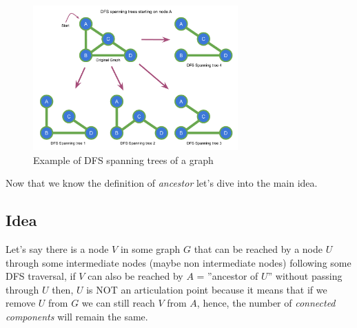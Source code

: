 \documentclass[twoside, openany]{book}
\begin{document}
\begin{figure}[H]
  \centering
  \includegraphics[width=0.7\textwidth]{"Images/Graph Theory/Articulation Points And Bridges/g2.pdf"}
  \caption{Example of DFS spanning trees of a graph}
  \label{fig:apb_g2}
\end{figure}


Now that we know the definition of \textit{ancestor} let's dive into the main idea.

\subsection*{Idea}

Let's say there is a node $V$ in some graph $G$ that can be reached by a node $U$ through some
intermediate nodes (maybe non intermediate nodes) following some DFS traversal, if $V$ can also be
reached by $A$ = ''ancestor of $U$'' without passing through $U$ then, $U$ is NOT an articulation point
because it means that if we remove $U$ from $G$ we can still reach $V$ from $A$, hence, the number of
\textit{connected components} will remain the same.
\begin{multicols*}{2}
\end{multicols*}
\end{document}
